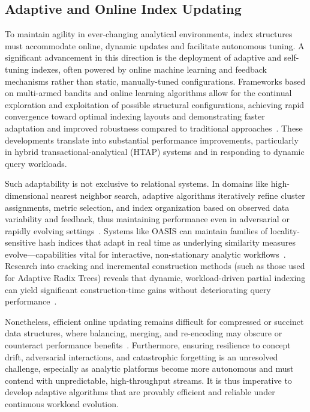 \subsection{Adaptive and Online Index Updating}

To maintain agility in ever-changing analytical environments, index structures must accommodate online, dynamic updates and facilitate autonomous tuning. A significant advancement in this direction is the deployment of adaptive and self-tuning indexes, often powered by online machine learning and feedback mechanisms rather than static, manually-tuned configurations. Frameworks based on multi-armed bandits and online learning algorithms allow for the continual exploration and exploitation of possible structural configurations, achieving rapid convergence toward optimal indexing layouts and demonstrating faster adaptation and improved robustness compared to traditional approaches~\cite{ref79,ref80,ref105}. These developments translate into substantial performance improvements, particularly in hybrid transactional-analytical (HTAP) systems and in responding to dynamic query workloads.

Such adaptability is not exclusive to relational systems. In domains like high-dimensional nearest neighbor search, adaptive algorithms iteratively refine cluster assignments, metric selection, and index organization based on observed data variability and feedback, thus maintaining performance even in adversarial or rapidly evolving settings~\cite{ref110}. Systems like OASIS can maintain families of locality-sensitive hash indices that adapt in real time as underlying similarity measures evolve---capabilities vital for interactive, non-stationary analytic workflows~\cite{ref110}. Research into cracking and incremental construction methods (such as those used for Adaptive Radix Trees) reveals that dynamic, workload-driven partial indexing can yield significant construction-time gains without deteriorating query performance~\cite{ref109}.

Nonetheless, efficient online updating remains difficult for compressed or succinct data structures, where balancing, merging, and re-encoding may obscure or counteract performance benefits~\cite{ref80,ref81,ref82,ref108,ref109}. Furthermore, ensuring resilience to concept drift, adversarial interactions, and catastrophic forgetting is an unresolved challenge, especially as analytic platforms become more autonomous and must contend with unpredictable, high-throughput streams. It is thus imperative to develop adaptive algorithms that are provably efficient and reliable under continuous workload evolution.

